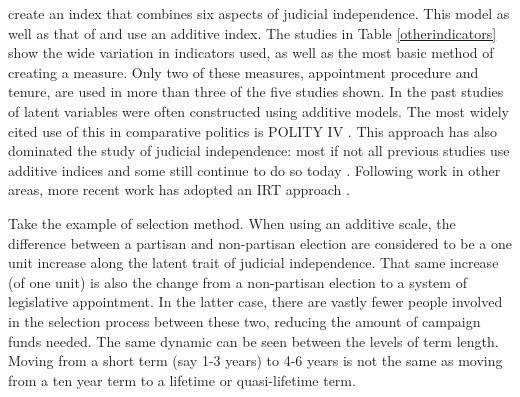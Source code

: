 \documentclass[12pt]{article}
\begin{document}
\citet*{Melton2014} create an index that combines six aspects of judicial independence.  This model as well as that of \citet*{Feld2003} and \citet*{Keith2002b} use an additive index.  The studies in Table \ref{otherindicators} show the wide variation in indicators used, as well as the most basic method of creating a measure.  Only two of these measures, appointment procedure and tenure, are used in more than three of the five studies shown.
In the past studies of latent variables were often constructed using additive models.  The most widely cited use of this in comparative politics is POLITY IV \citep{Polity}.  This approach has also dominated the study of judicial independence: most if not all previous studies use additive indices \citep{Feld2003,Keith2002a,Laporta2004} and some still continue to do so today \citep{Melton2014}.  Following work in other areas, more recent work has adopted an IRT approach \citep{Martin2002,Treier2008,Schnakenberg2014,Linzer2014,Fariss2014}.

Take the example of selection method.  When using an additive scale, the difference between a partisan and non-partisan election are considered to be a one unit increase along the latent trait of judicial independence.  That same increase (of one unit) is also the change from a non-partisan election to a system of legislative appointment.  In the latter case, there are vastly fewer people involved in the selection process between these two, reducing the amount of campaign funds needed.  The same dynamic can be seen between the levels of term length.  Moving from a short term (say 1-3 years) to 4-6 years is not the same as moving from a ten year term to a lifetime or quasi-lifetime term.
\end{document}
